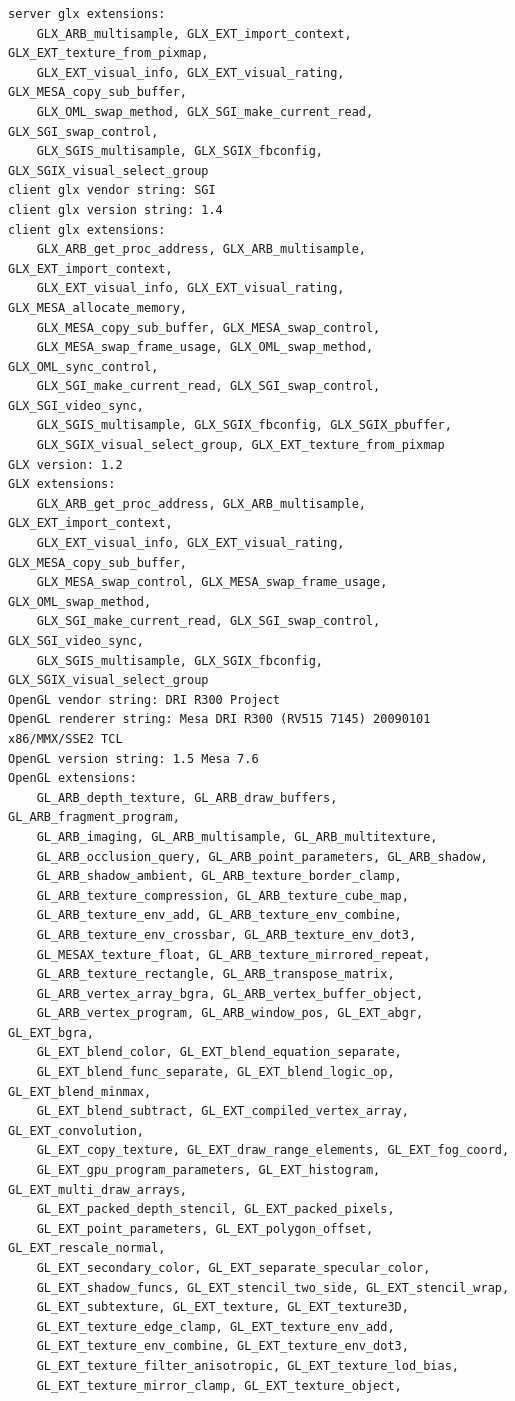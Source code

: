 \begin{verbatim}
server glx extensions:
    GLX_ARB_multisample, GLX_EXT_import_context, GLX_EXT_texture_from_pixmap, 
    GLX_EXT_visual_info, GLX_EXT_visual_rating, GLX_MESA_copy_sub_buffer, 
    GLX_OML_swap_method, GLX_SGI_make_current_read, GLX_SGI_swap_control, 
    GLX_SGIS_multisample, GLX_SGIX_fbconfig, GLX_SGIX_visual_select_group
client glx vendor string: SGI
client glx version string: 1.4
client glx extensions:
    GLX_ARB_get_proc_address, GLX_ARB_multisample, GLX_EXT_import_context, 
    GLX_EXT_visual_info, GLX_EXT_visual_rating, GLX_MESA_allocate_memory, 
    GLX_MESA_copy_sub_buffer, GLX_MESA_swap_control, 
    GLX_MESA_swap_frame_usage, GLX_OML_swap_method, GLX_OML_sync_control, 
    GLX_SGI_make_current_read, GLX_SGI_swap_control, GLX_SGI_video_sync, 
    GLX_SGIS_multisample, GLX_SGIX_fbconfig, GLX_SGIX_pbuffer, 
    GLX_SGIX_visual_select_group, GLX_EXT_texture_from_pixmap
GLX version: 1.2
GLX extensions:
    GLX_ARB_get_proc_address, GLX_ARB_multisample, GLX_EXT_import_context, 
    GLX_EXT_visual_info, GLX_EXT_visual_rating, GLX_MESA_copy_sub_buffer, 
    GLX_MESA_swap_control, GLX_MESA_swap_frame_usage, GLX_OML_swap_method, 
    GLX_SGI_make_current_read, GLX_SGI_swap_control, GLX_SGI_video_sync, 
    GLX_SGIS_multisample, GLX_SGIX_fbconfig, GLX_SGIX_visual_select_group
OpenGL vendor string: DRI R300 Project
OpenGL renderer string: Mesa DRI R300 (RV515 7145) 20090101 x86/MMX/SSE2 TCL
OpenGL version string: 1.5 Mesa 7.6
OpenGL extensions:
    GL_ARB_depth_texture, GL_ARB_draw_buffers, GL_ARB_fragment_program, 
    GL_ARB_imaging, GL_ARB_multisample, GL_ARB_multitexture, 
    GL_ARB_occlusion_query, GL_ARB_point_parameters, GL_ARB_shadow, 
    GL_ARB_shadow_ambient, GL_ARB_texture_border_clamp, 
    GL_ARB_texture_compression, GL_ARB_texture_cube_map, 
    GL_ARB_texture_env_add, GL_ARB_texture_env_combine, 
    GL_ARB_texture_env_crossbar, GL_ARB_texture_env_dot3, 
    GL_MESAX_texture_float, GL_ARB_texture_mirrored_repeat, 
    GL_ARB_texture_rectangle, GL_ARB_transpose_matrix, 
    GL_ARB_vertex_array_bgra, GL_ARB_vertex_buffer_object, 
    GL_ARB_vertex_program, GL_ARB_window_pos, GL_EXT_abgr, GL_EXT_bgra, 
    GL_EXT_blend_color, GL_EXT_blend_equation_separate, 
    GL_EXT_blend_func_separate, GL_EXT_blend_logic_op, GL_EXT_blend_minmax, 
    GL_EXT_blend_subtract, GL_EXT_compiled_vertex_array, GL_EXT_convolution, 
    GL_EXT_copy_texture, GL_EXT_draw_range_elements, GL_EXT_fog_coord, 
    GL_EXT_gpu_program_parameters, GL_EXT_histogram, GL_EXT_multi_draw_arrays, 
    GL_EXT_packed_depth_stencil, GL_EXT_packed_pixels, 
    GL_EXT_point_parameters, GL_EXT_polygon_offset, GL_EXT_rescale_normal, 
    GL_EXT_secondary_color, GL_EXT_separate_specular_color, 
    GL_EXT_shadow_funcs, GL_EXT_stencil_two_side, GL_EXT_stencil_wrap, 
    GL_EXT_subtexture, GL_EXT_texture, GL_EXT_texture3D, 
    GL_EXT_texture_edge_clamp, GL_EXT_texture_env_add, 
    GL_EXT_texture_env_combine, GL_EXT_texture_env_dot3, 
    GL_EXT_texture_filter_anisotropic, GL_EXT_texture_lod_bias, 
    GL_EXT_texture_mirror_clamp, GL_EXT_texture_object, 


\end{verbatim}
